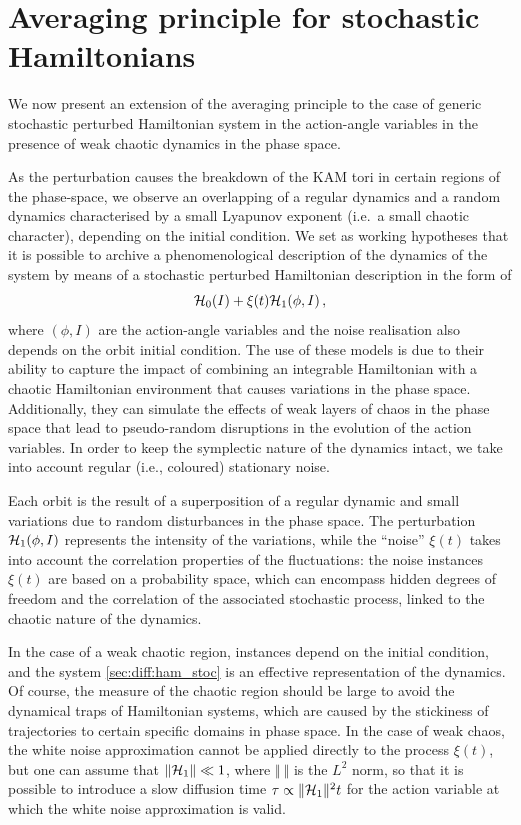 %
\section{Averaging principle for stochastic Hamilto\-nians}\label{sec:diff:averaging_principle}
%
We now present an extension of the averaging principle to the case of generic stochastic perturbed Hamiltonian system in the action-angle variables in the presence of weak chaotic dynamics in the phase space.

As the perturbation causes the breakdown of the KAM tori in certain regions of the phase-space, we observe an overlapping of a regular dynamics and a random dynamics characterised by a small Lyapunov exponent (i.e.\ a small chaotic character), depending on the initial condition. We set as working hypotheses that it is possible to archive a phenomenological description of the dynamics of the system by means of a stochastic perturbed Hamiltonian description in the form of
\begin{equation}
    \mathcal{H}_0(I)+\xi(t) \mathcal{H}_1(\phi,I) \,,
    \label{sec:diff:ham_stoc}
\end{equation}
where $(\phi,I)$ are the action-angle variables and the noise realisation also depends on the orbit initial condition. The use of these models is due to their ability to capture the impact of combining an integrable Hamiltonian with a chaotic Hamiltonian environment that causes variations in the phase space. Additionally, they can simulate the effects of weak layers of chaos in the phase space that lead to pseudo-random disruptions in the evolution of the action variables. In order to keep the symplectic nature of the dynamics intact, we take into account regular (i.e., coloured) stationary noise.

Each orbit is the result of a superposition of a regular dynamic and small variations due to random disturbances in the phase space. The perturbation $\mathcal{H}_1(\phi,I)$ represents the intensity of the variations, while the ``noise'' $\xi(t)$ takes into account the correlation properties of the fluctuations: the noise instances $\xi(t)$ are based on a probability space, which can encompass hidden degrees of freedom and the correlation of the associated stochastic process, linked to the chaotic nature of the dynamics.

In the case of a weak chaotic region, instances depend on the initial condition, and the system \eqref{sec:diff:ham_stoc} is an effective representation of the dynamics. Of course, the measure of the chaotic region should be large to avoid the dynamical traps of Hamiltonian systems, which are caused by the stickiness of trajectories to certain specific domains in phase space. In the case of weak chaos, the white noise approximation cannot be applied directly to the process $\xi(t)$, but one can assume that $\Vert \mathcal{H}_1\Vert \ll 1$, where $\Vert\ \Vert$ is the $L^2$ norm, so that it is possible to introduce a slow diffusion time $\tau \propto \Vert \mathcal{H}_1\Vert^2 t$ for the action variable at which the white noise approximation is valid.

